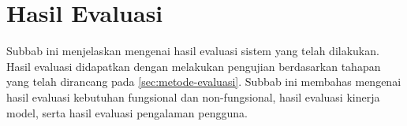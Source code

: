 \section{Hasil Evaluasi}
\label{sec:hasil-evaluasi}
Subbab ini menjelaskan mengenai hasil evaluasi sistem yang telah dilakukan. Hasil evaluasi didapatkan dengan melakukan pengujian berdasarkan tahapan yang telah dirancang pada \autoref{sec:metode-evaluasi}. Subbab ini membahas mengenai hasil evaluasi kebutuhan fungsional dan non-fungsional, hasil evaluasi kinerja model, serta hasil evaluasi pengalaman pengguna. 





